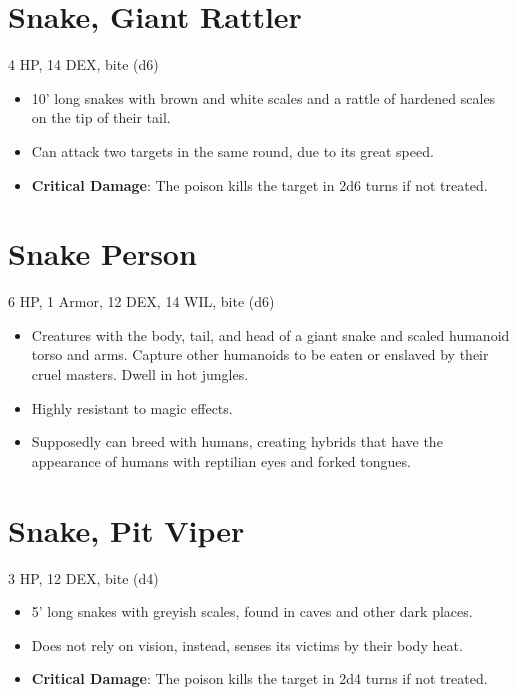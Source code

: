 \documentclass[
  10pt,
  american,
]{article}
\begin{document}
\hypertarget{snake-giant-rattler}{%
\section{Snake, Giant Rattler}\label{snake-giant-rattler}}

4 HP, 14 DEX, bite (d6)

\begin{samepage}
\begin{itemize}
\setlength\itemsep{-.5em}
\item 10' long snakes with brown and white scales and a rattle of hardened scales on the tip of their tail.
\item Can attack two targets in the same round, due to its great speed.
\item \textbf{Critical Damage}: The poison kills the target in 2d6 turns if not treated.
\end{itemize}
\end{samepage}

\hypertarget{snake-person}{%
\section{Snake Person}\label{snake-person}}

6 HP, 1 Armor, 12 DEX, 14 WIL, bite (d6)

\begin{samepage}
\begin{itemize}
\setlength\itemsep{-.5em}
\item Creatures with the body, tail, and head of a giant snake and scaled humanoid torso and arms. Capture other humanoids to be eaten or enslaved by their cruel masters. Dwell in hot jungles.
\item Highly resistant to magic effects.
\item Supposedly can breed with humans, creating hybrids that have the appearance of humans with reptilian eyes and forked tongues.
\end{itemize}
\end{samepage}

\hypertarget{snake-pit-viper}{%
\section{Snake, Pit Viper}\label{snake-pit-viper}}

3 HP, 12 DEX, bite (d4)

\begin{samepage}
\begin{itemize}
\setlength\itemsep{-.5em}
\item 5' long snakes with greyish scales, found in caves and other dark places.
\item Does not rely on vision, instead, senses its victims by their body heat.
\item \textbf{Critical Damage}: The poison kills the target in 2d4 turns if not treated.
\end{itemize}
\end{samepage}
\end{document}
